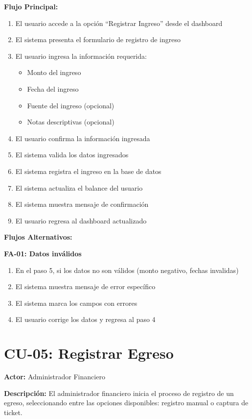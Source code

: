 \noindent\textbf{Flujo Principal:}
\begin{enumerate}
    \item El usuario accede a la opción ``Registrar Ingreso'' desde el dashboard
    \item El sistema presenta el formulario de registro de ingreso
    \item El usuario ingresa la información requerida:
    \begin{itemize}
        \item Monto del ingreso
        \item Fecha del ingreso
        \item Fuente del ingreso (opcional)
        \item Notas descriptivas (opcional)
    \end{itemize}
    \item El usuario confirma la información ingresada
    \item El sistema valida los datos ingresados
    \item El sistema registra el ingreso en la base de datos
    \item El sistema actualiza el balance del usuario
    \item El sistema muestra mensaje de confirmación
    \item El usuario regresa al dashboard actualizado
\end{enumerate}

\noindent\textbf{Flujos Alternativos:}

\textbf{FA-01: Datos inválidos}
\begin{enumerate}
    \item En el paso 5, si los datos no son válidos (monto negativo, fechas invalidas)
    \item El sistema muestra mensaje de error específico
    \item El sistema marca los campos con errores
    \item El usuario corrige los datos y regresa al paso 4
\end{enumerate}

\section{CU-05: Registrar Egreso}

\noindent\textbf{Actor:} Administrador Financiero

\noindent\textbf{Descripción:} El administrador financiero inicia el proceso de registro de un egreso, seleccionando entre las opciones disponibles: registro manual o captura de ticket.


